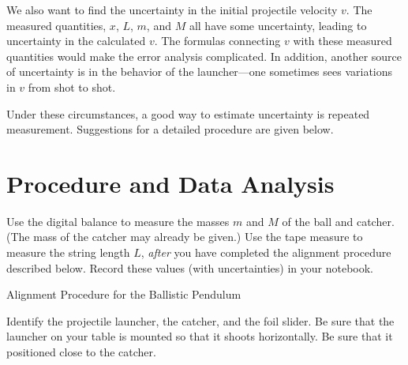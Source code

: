 We also want to find the uncertainty in the initial projectile
velocity $v$.  The measured quantities, $x$, $L$, $m$, and $M$ all
have some uncertainty, leading to uncertainty in the calculated $v$.
The formulas connecting $v$ with these measured quantities would make
the error analysis complicated.  In addition, another source of
uncertainty is in the behavior of the launcher---one sometimes sees
variations in $v$ from shot to shot.

Under these circumstances, a good way to estimate 
uncertainty is repeated measurement.
Suggestions for a detailed
procedure are given below.

%



\section*{Procedure and Data Analysis}

\be



\item Use the digital balance to measure the masses $m$ and $M$ of the
ball and catcher.  (The mass of the catcher may already be given.) 
Use the tape measure to measure the string length
$L$, {\it after} you have completed the alignment procedure described
below. Record these values (with uncertainties) in your notebook.

\item  Alignment Procedure for the Ballistic Pendulum

Identify the projectile launcher, the catcher, and the foil slider.
Be sure that the launcher on your table is mounted so that it shoots
horizontally.  Be sure that it positioned close to the catcher.

